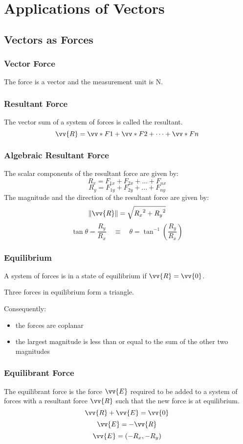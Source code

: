 \chapter{Applications of Vectors}
	\section{Vectors as Forces}
		\subsection{Vector Force}
			The force is a vector and the measurement unit is \si{\newton}.
		\subsection{Resultant Force}
			The vector sum of a system of forces is called the resultant.
			\[\vv{R} = \vv*{F}{1} + \vv*{F}{2} + \dots + \vv*{F}{n}\]
		\subsection{Algebraic Resultant Force}
			The scalar components of the resultant force are given by:
			\[R_x = F_{1x} + F_{2x} + \dots + F_{nx}\]
			\[R_y = F_{1y} + F_{2y} + \dots + F_{ny}\]
			The magnitude and the direction of the resultant force are given by:
			\[\|\vv{R}\| = \sqrt{{R_x}^2 + {R_y}^2}\]
			\[\tan\theta = \frac{R_y}{R_x} \quad \equiv \quad \theta = \tan^{-1}\left(\frac{R_y}{R_x}\right)\]
		\subsection{Equilibrium}
			A system of forces is in a state of equilibrium if $\vv{R} = \vv{0}$.

			Three forces in equilibrium form a triangle.

			Consequently:
			\begin{itemize}
				\item the forces are coplanar
				\item the largest magnitude is less than or equal to the sum of the other two magnitudes
			\end{itemize}
		\subsection{Equilibrant Force}
			The equilibrant force is the force $\vv{E}$ required to be added to a system of forces with a resultant force $\vv{R}$ such that the new force is at equilibrium.
			\[\vv{R} + \vv{E} = \vv{0}\]
			\[\vv{E} = -\vv{R}\]
			\[\vv{E} = (-R_x, -R_y)\]
